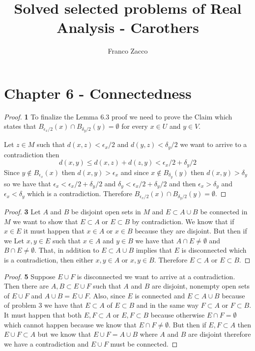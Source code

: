 \documentclass[11pt]{article}
\title{\textbf{Solved selected problems of Real Analysis - Carothers}}
\author{Franco Zacco}
\date{}
\theoremstyle{definition}
\begin{document}
\maketitle
\thispagestyle{empty}

\section*{Chapter 6 - Connectedness}

	\begin{proof}{\textbf{1}}
        To finalize the Lemma 6.3 proof we need to prove the Claim which states
        that $B_{\epsilon_x/2}(x) \cap B_{\delta_y/2}(y) = \emptyset$ for every
        $x \in U$ and $y \in V$.

        Let $z \in M$ such that $d(x,z) < \epsilon_x / 2$ and
        $d(y,z) < \delta_y / 2$ we want to arrive to a contradiction then
        $$d(x,y) \leq d(x,z) + d(z,y) < \epsilon_x / 2 + \delta_y / 2$$
        Since $y \not\in B_{\epsilon_x}(x)$ then $d(x,y) > \epsilon_x$ and 
        since $x \not\in B_{\delta_y}(y)$ then $d(x,y) > \delta_y$ so we have
        that $\epsilon_x < \epsilon_x/2 + \delta_y/2$ and
        $\delta_y < \epsilon_x/2 + \delta_y/2$ and then
        $\epsilon_x > \delta_y$ and $\epsilon_x < \delta_y$ which is a
        contradiction. 
        Therefore $B_{\epsilon_x/2}(x) \cap B_{\delta_y/2}(y) = \emptyset$.
    \end{proof}
	\begin{proof}{\textbf{3}}
        Let $A$ and $B$ be disjoint open sets in $M$ and $E \subset A \cup B$
        be connected in $M$ we want to show that $E \subset A$ or $E \subset B$
        by contradiction. We know that if $x \in E$ it must happen that
        $x \in A$ or $x \in B$ because they are disjoint.
        But then if we Let $x,y \in E$ such that $x\in A$ and $y \in B$ we have
        that $A \cap E \neq \emptyset$ and $B \cap E \neq \emptyset$. That,
        in addition to $E \subset A \cup B$ implies that $E$ is disconnected
        which is a contradiction, then either $x,y \in A$ or $x,y \in B$.
        Therefore $E \subset A$ or $E \subset B$.
    \end{proof}
	\begin{proof}{\textbf{5}}
        Suppose $E \cup F$ is disconnected we want to arrive at a contradiction.
        Then there are $A, B \subset E \cup F$ such that $A$ and $B$ are disjoint,
        nonempty open sets of $E \cup F$ and $A \cup B = E \cup F$.
        Also, since $E$ is connected and $E \subset A \cup B$
        because of problem 3 we have that $E \subset A$ of $E \subset B$
        and in the same way $F \subset A$ or $F \subset B$. It must happen that
        both $E,F \subset A$ or $E,F \subset B$ because otherwise
        $E \cap F = \emptyset$ which cannot happen because we know that
        $E \cap F  \neq \emptyset$. But then if $E,F \subset A$ then 
        $E \cup F  \subset A$ but we know that $E \cup F = A \cup B$ where $A$
        and $B$ are disjoint therefore we have a contradiction and $E \cup F$
        must be connected.
    \end{proof}
\end{document}
